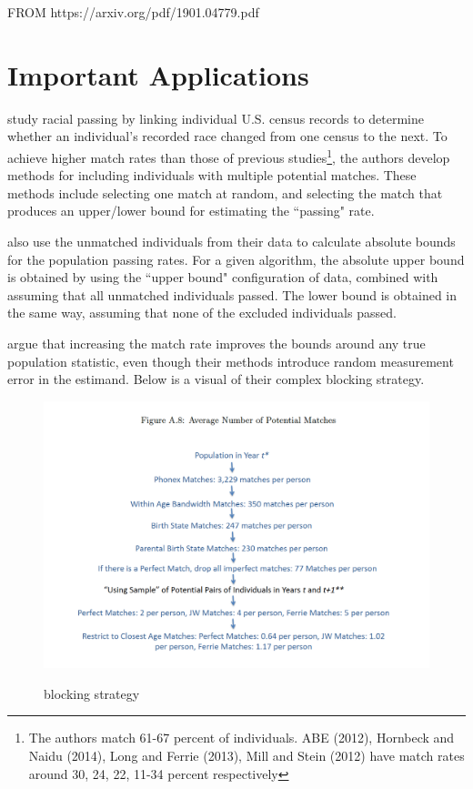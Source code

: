 \documentclass[12pt]{article}
\begin{document}
FROM https://arxiv.org/pdf/1901.04779.pdf
 
\section*{Important Applications}

\cite{nq2015} study racial passing by linking individual U.S. census records to determine whether an individual's recorded race changed from one census to the next.  To achieve higher match rates than those of previous studies\footnote{The authors match 61-67 percent of individuals.   ABE (2012), Hornbeck and Naidu (2014), Long and Ferrie (2013), Mill and Stein (2012)
have match rates around 30, 24, 22, 11-34 percent respectively}, the authors develop methods for including individuals with multiple potential matches.  These methods include selecting one match at random, and selecting the match that produces an upper/lower bound for estimating the ``passing" rate.  

\cite{nq2015} also use the unmatched individuals from their data to calculate absolute bounds for the population passing rates.  For a given algorithm, the absolute upper bound is obtained by using the ``upper bound" configuration of data, combined with assuming that all unmatched individuals passed.  The lower bound is obtained in the same way, assuming that none of the excluded individuals passed. 

\cite{nq2015} argue that increasing the match rate improves the bounds around any true population statistic, even though their methods introduce random measurement error in the estimand.  Below is a visual of their complex blocking strategy.

\begin{figure}[htbp]
\begin{center}
\caption{\cite{nq2015} blocking strategy}
\includegraphics[width=\textwidth]{nq_method.png}
\label{default}
\end{center}
\end{figure}
\end{document}

